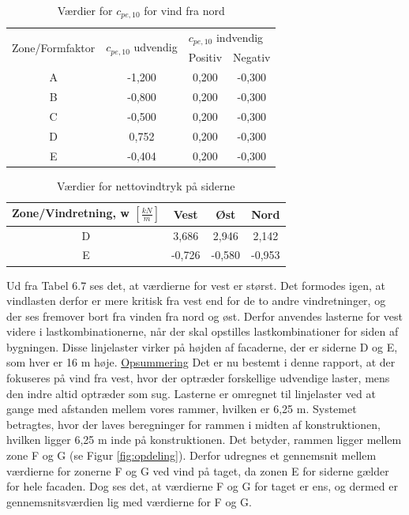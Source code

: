 \begin{table}[htb]
	\begin{center}
		\begin{tabular}{ |c|c|c|c| } 
			\hline
			\multirow{2}{*}{Zone/Formfaktor} & \multirow{2}{*}{$c_{pe,10}$ udvendig} & \multicolumn{2}{l|}{$c_{pe,10}$ indvendig} \\ \cline{3-4} 
			& & Positiv & Negativ   		\\ \hline
			A & -1,200 & 0,200 & -0,300 \\	\hline
			B & -0,800 & 0,200 & -0,300 \\	\hline
			C & -0,500 & 0,200 & -0,300 \\	\hline 
			D & 0,752 & 0,200 & -0,300 \\	\hline
			E & -0,404 & 0,200 & -0,300 \\	\hline
		\end{tabular}
		\caption{Værdier for $c_{pe,10}$ for vind fra nord}
		\label{tab:gg}
	\end{center}
\end{table}

\begin{table}[htb]
	\begin{center}
		\begin{tabular}{|c|c|c|c|}
			\hline
			Zone/Vindretning, w $[\frac{kN}{m}]$ & Vest & Øst & Nord \\ \hline
			D & 3,686 & 2,946 & 2,142 \\ \hline
			E & -0,726 & -0,580 & -0,953 \\ \hline
		\end{tabular}
		\caption{Værdier for nettovindtryk på siderne}
		\label{tab:hh}
	\end{center}
\end{table}

Ud fra Tabel 6.7 ses det, at værdierne for vest er størst. Det formodes igen, at vindlasten derfor er mere kritisk fra vest end for de to andre vindretninger, og der ses fremover bort fra vinden fra nord og øst. Derfor anvendes lasterne for vest videre i lastkombinationerne, når der skal opstilles lastkombinationer for siden af bygningen.
\newline \indent{     }  Disse linjelaster virker på højden af facaderne, der er siderne D og E, som hver er 16 m høje.
\newline
\newline
\underline{Opsummering}
\newline
Det er nu bestemt i denne rapport, at der fokuseres på vind fra vest, hvor der optræder forskellige udvendige laster, mens den indre altid optræder som sug. Lasterne er omregnet til linjelaster ved at gange med afstanden mellem vores rammer, hvilken er 6,25 m. 
\newline
\newline
Systemet betragtes, hvor der laves beregninger for rammen i midten af konstruktionen, hvilken ligger 6,25 m inde på konstruktionen. Det betyder, rammen ligger mellem zone F og G (se Figur \ref{fig:opdeling}). Derfor udregnes et gennemsnit mellem værdierne for zonerne F og G ved vind på taget, da zonen E for siderne gælder for hele facaden. 
Dog ses det, at værdierne F og G for taget er ens, og dermed er gennemsnitsværdien lig med værdierne for F og G. 

